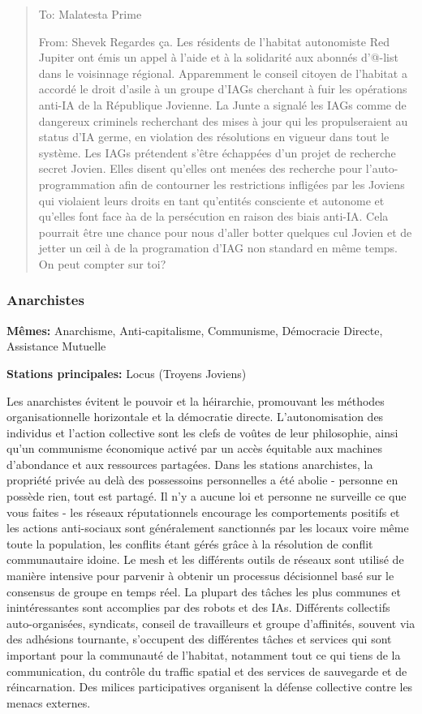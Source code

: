 \begin{quotation} To: Malatesta Prime 

From: Shevek Regardes ça. Les résidents de l'habitat autonomiste Red Jupiter ont émis un appel à l'aide et à la solidarité aux abonnés d'@-list dans le voisinnage régional. Apparemment le conseil citoyen de l'habitat a accordé le droit d'asile à un groupe d'IAGs cherchant à fuir les opérations anti-IA de la République Jovienne. La Junte a signalé les IAGs comme de dangereux criminels recherchant des mises à jour qui les propulseraient au status d'IA germe, en violation des résolutions en vigueur dans tout le système. Les IAGs prétendent s'être échappées d'un projet de recherche secret Jovien. Elles disent qu'elles ont menées des recherche pour l'auto-programmation afin de contourner les restrictions infligées par les Joviens qui violaient leurs droits en tant qu'entités consciente et autonome et qu'elles font face àa de la persécution en raison des biais anti-IA. Cela pourrait être une chance pour nous d'aller botter quelques cul Jovien et de jetter un œil à de la programation d'IAG non standard en même temps. On peut compter sur toi? \end{quotation} 

\subsubsection{Anarchistes} \label{sec:anarchists} 

\textbf{Mêmes:} Anarchisme, Anti-capitalisme, Communisme, Démocracie Directe, Assistance Mutuelle 

\textbf{Stations principales:} Locus (Troyens Joviens) 

Les anarchistes évitent le pouvoir et la héirarchie, promouvant les méthodes organisationnelle horizontale et la démocratie directe. L'autonomisation des individus et l'action collective sont les clefs de voûtes de leur philosophie, ainsi qu'un communisme économique activé par un accès équitable aux machines d'abondance et aux ressources partagées. Dans les stations anarchistes, la propriété privée au delà des possessoins personnelles a été abolie - personne en possède rien, tout est partagé. Il n'y a aucune loi et personne ne surveille ce que vous faites - les réseaux réputationnels encourage les comportements positifs et les actions anti-sociaux sont généralement sanctionnés par les locaux voire même toute la population, les conflits étant gérés grâce à la résolution de conflit communautaire idoine. Le mesh et les différents outils de réseaux sont utilisé de manière intensive pour parvenir à obtenir un processus décisionnel basé sur le consensus de groupe en temps réel. La plupart des tâches les plus communes et inintéressantes sont accomplies par des robots et des IAs. Différents collectifs auto-organisées, syndicats, conseil de travailleurs et groupe d'affinités, souvent via des adhésions tournante, s'occupent des différentes tâches et services qui sont important pour la communauté de l'habitat, notamment tout ce qui tiens de la communication, du contrôle du traffic spatial et des services de sauvegarde et de réincarnation. Des milices participatives organisent la défense collective contre les menacs externes. 

